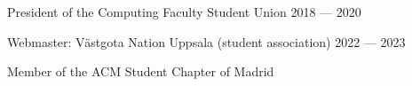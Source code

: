 President of the Computing Faculty Student Union	\hfill 2018 --- 2020
 

Webmaster: Västgota Nation Uppsala (student association)	\hfill 2022 --- 2023

Member of the ACM Student Chapter of Madrid 
